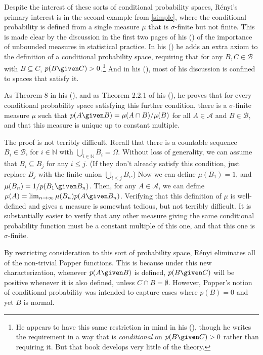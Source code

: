Despite the interest of these sorts of conditional probability spaces, R\'{e}nyi's primary interest is in the second example from \autoref{simple}, where the conditional probability is defined from a single measure $\mu$ that is $\sigma$-finite but not finite. This is made clear by the discussion in the first two pages of his (\citeyear{renyinew}) of the importance of unbounded measures in statistical practice. In his (\citeyear{renyi}) he adds an extra axiom to the definition of a conditional probability space, requiring that for any $B,C\in\mathcal{B}$ with $B\subseteq C$, $p(B \given C)>0$.\footnote{He appears to have this same restriction in mind in his (\citeyear{renyiprob}), though he writes the requirement in a way that is \emph{conditional} on $p(B \given C)>0$ rather than requiring it. But that book develops very little of the theory.} And in his (\citeyear{renyinew}), most of his discussion is confined to spaces that satisfy it.

As Theorem 8 in his (\citeyear{renyinew}), and as Theorem 2.2.1 of his (\citeyear{renyi}), he proves that for every conditional probability space satisfying this further condition, there is a $\sigma$-finite measure $\mu$ such that $p(A \given B)=\mu(A\cap B)/\mu(B)$ for all $A\in\mathcal{A}$ and $B\in\mathcal{B}$, and that this measure is unique up to constant multiple.

The proof is not terribly difficult. Recall that there is a countable sequence $B_i\in\mathcal{B}$, for $i\in\mathbb{N}$ with $\bigcup_{i\in\mathbb{N}}B_i=\Omega$. Without loss of generality, we can assume that $B_i\subseteq B_j$ for any $i\leq j$. (If they don't already satisfy this condition, just replace $B_j$ with the finite union $\bigcup_{i\leq j}B_i$.) Now we can define $\mu(B_1)=1$, and $\mu(B_n)=1/p(B_1 \given B_n)$. Then, for any $A\in\mathcal{A}$, we can define $\mu(A)=\lim_{n\to\infty} \mu(B_n)p(A \given B_n)$. Verifying that this definition of $\mu$ is well-defined and gives a measure is somewhat tedious, but not terribly difficult. It is substantially easier to verify that any other measure giving the same conditional probability function must be a constant multiple of this one, and that this one is $\sigma$-finite.

By restricting consideration to this sort of probability space, R\'{e}nyi eliminates all of the non-trivial Popper functions. This is because under this new characterization, whenever $p(A \given B)$ is defined, $p(B \given C)$ will be positive whenever it is also defined, unless $C\cap B=\emptyset$. However, Popper's notion of conditional probability was intended to capture cases where $p(B)=0$ and yet $B$ is normal. 

